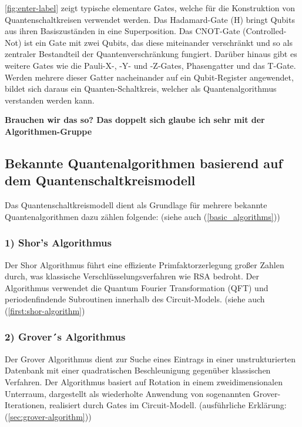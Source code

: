 \autoref{fig:enter-label} zeigt typische elementare Gates, welche für die Konstruktion von Quantenschaltkreisen verwendet werden. Das Hadamard-Gate (H) bringt Qubits aus ihren Basiszuständen in eine Superposition. Das CNOT-Gate (Controlled-Not) ist ein Gate mit zwei Qubits, das diese miteinander verschränkt und so als zentraler Bestandteil der Quantenverschränkung fungiert. Darüber hinaus gibt es weitere Gates wie die Pauli-X-, -Y- und -Z-Gates, Phasengatter und das T-Gate. Werden mehrere dieser Gatter nacheinander auf ein Qubit-Register angewendet, bildet sich daraus ein Quanten-Schaltkreis, welcher als Quantenalgorithmus verstanden werden kann. \autocite[174-188]{nielsen_quantum_2010}

\textbf{Brauchen wir das so? Das doppelt sich glaube ich sehr mit der Algorithmen-Gruppe}

\subsection*{Bekannte Quantenalgorithmen basierend auf dem Quantenschaltkreismodell}

Das Quantenschaltkreismodell dient als Grundlage für mehrere bekannte Quantenalgorithmen dazu zählen folgende: (siehe auch (\autoref{basic_algorithms}))
\subsubsection*{1) Shor's Algorithmus}
Der Shor Algorithmus führt eine effiziente Primfaktorzerlegung großer Zahlen durch, was klassische Verschlüsselungsverfahren wie RSA bedroht. Der Algorithmus verwendet die Quantum Fourier Transformation (QFT) und periodenfindende Subroutinen innerhalb des Circuit-Models. (siehe auch (\autoref{first:shor-algorithm}) \autocite[226-232]{nielsen_quantum_2010} \autocite{haywardQuantumComputingShors2005}

\subsubsection*{2) Grover´s Algorithmus}
Der Grover Algorithmus dient zur Suche eines Eintrags in einer unstrukturierten Datenbank mit einer quadratischen Beschleunigung gegenüber klassischen Verfahren.
Der Algorithmus basiert auf Rotation in einem zweidimensionalen Unterraum, dargestellt als wiederholte Anwendung von sogenannten Grover-Iterationen, realisiert durch Gates im Circuit-Modell. (ausführliche Erklärung: (\autoref{sec:grover-algorithm}))  \autocite[248-254]{nielsen_quantum_2010}

